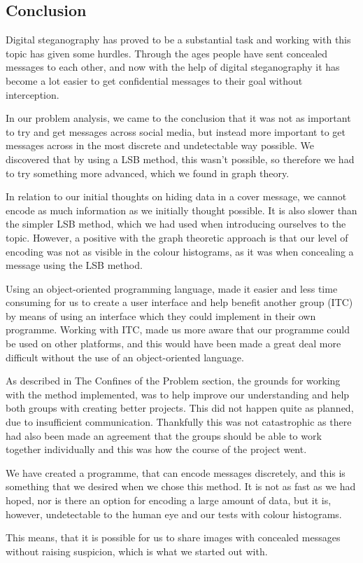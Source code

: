 \subsection{Conclusion}
Digital steganography has proved to be a substantial task and working with this topic has given some hurdles. Through the ages people have sent concealed messages to each other, and now with the help of digital steganography it has become a lot easier to get confidential messages to their goal without interception.

In our problem analysis, we came to the conclusion that it was not as important to try and get messages across social media, but instead more important to get messages across in the most discrete and undetectable way possible. We discovered that by using a LSB method, this wasn't possible, so therefore we had to try something more advanced, which we found in graph theory.
 
In relation to our initial thoughts on hiding data in a cover message, we cannot encode as much information as we initially thought possible. It is also slower than the simpler LSB method, which we had used when introducing ourselves to the topic. However, a positive with the graph theoretic approach is that our level of encoding was not as visible in the colour histograms, as it was when concealing a message using the LSB method.

Using an object-oriented programming language, made it easier and less time consuming for us to create a user interface and help benefit another group (ITC) by means of using an interface which they could implement in their own programme. Working with ITC, made us more aware that our programme could be used on other platforms, and this would have been made a great deal more difficult without the use of an object-oriented language.

As described in The Confines of the Problem section, the grounds for working with the method implemented, was to help improve our understanding and help both groups with creating better projects. This did not happen quite as planned, due to insufficient communication. Thankfully this was not catastrophic as there had also been made an agreement that the groups should be able to work together individually and this was how the course of the project went.

We have created a programme, that can encode messages discretely, and this is something that we desired when we chose this method. It is not as fast as we had hoped, nor is there an option for encoding a large amount of data, but it is, however, undetectable to the human eye and our tests with colour histograms.

This means, that it is possible for us to share images with concealed messages without raising suspicion, which is what we started out with.